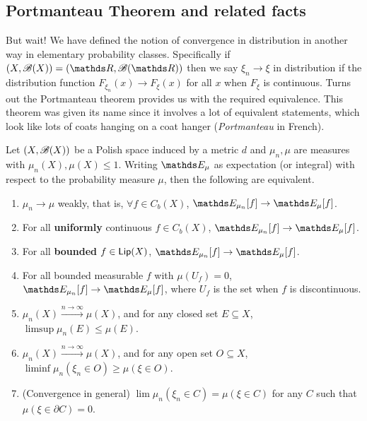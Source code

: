 \subsection{Portmanteau Theorem and related facts}
But wait! We have defined the notion of convergence in distribution in another way in elementary probability classes. Specifically if $(X,\B(X)) = (\R, \B(\R))$ then we say $\xi_n \to \xi$ in distribution if the distribution function $F_{\xi_n}(x) \to F_{\xi}(x)$ for all $x$ when $F_\xi$ is continuous. Turns out the Portmanteau theorem provides us with the required equivalence. This theorem was given its name since it involves a lot of equivalent statements, which look like lots of coats hanging on a coat hanger (\textit{Portmanteau} in French).

\begin{theorem} \label{def:conv_in_dist}
Let $(X,\mathcal{B}(X))$ be a Polish space induced by a metric $d$ and $\mu_n, \mu$ are measures with $\mu_n(X), \mu(X) \leq 1$. Writing $\E_\mu$ as expectation (or integral) with respect to the probability measure $\mu$, then the following are equivalent.
\begin{enumerate}
    \item $\mu_n \to \mu$ weakly, that is, $\forall f \in C_b(X)$, $\E_{\mu_n}[f] \to \E_\mu[f]$.
    \item For all \textbf{uniformly} continuous $f \in C_b(X)$, $\E_{\mu_n}[f] \to \E_\mu[f]$.
    \item For all \textbf{bounded} $f \in \mathsf{Lip}(X)$, $\E_{\mu_n}[f] \to \E_\mu[f]$.
    \item For all bounded measurable $f$ with $\mu(U_f) = 0$, $\E_{\mu_n}[f] \to \E_\mu[f]$, where $U_f$ is the set when $f$ is discontinuous.
    \item $\mu_n(X) \overset{n\to\infty}{\to} \mu(X)$, and for any closed set $E \subseteq X$, $\limsup \mu_n(E) \leq \mu(E)$.
    \item $\mu_n(X) \overset{n\to\infty}{\to} \mu(X)$, and for any open set $O \subseteq X$, $\liminf \mu_n(\xi_n \in O) \ge \mu(\xi \in O)$.
    \item (Convergence in general) $\lim \mu_n (\xi_n \in C) = \mu(\xi \in C)$ for any $C$ such that $\mu(\xi \in \partial C) = 0$.
\end{enumerate}
\end{theorem}

